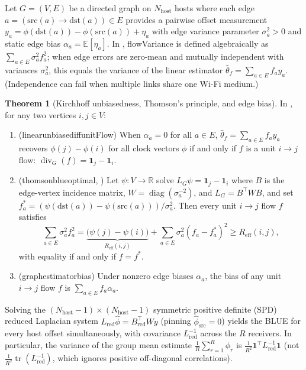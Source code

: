\documentclass[11pt,a4paper]{article}
\DeclareRobustCommand{\lean}[1]{{\ttfamily\def\_{\textunderscore\allowbreak}#1}}
\newcommand{\R}{\mathbb{R}}
\newcommand{\E}{\mathbb{E}}
\theoremstyle{definition}
\newtheorem{theorem}[definition]{Theorem}
\begin{document}
Let $G = (V, E)$ be a directed graph on $N_{\mathrm{host}}$ hosts where each
edge $a = (\mathrm{src}(a) \to \mathrm{dst}(a)) \in E$ provides a pairwise
offset measurement $y_a = \phi(\mathrm{dst}(a)) - \phi(\mathrm{src}(a)) + \eta_a$
with edge variance parameter $\sigma_a^2 > 0$ and static edge bias
$\alpha_a = \E[\eta_a]$. In ,
\lean{flowVariance} is defined algebraically as $\sum_{a \in E} \sigma_a^2 f_a^2$;
when edge errors are zero-mean and mutually independent with variances
$\sigma_a^2$, this equals the variance of the linear estimator
$\hat\theta_f = \sum_{a \in E} f_a y_a$. (Independence can fail when multiple
links share one Wi-Fi medium.)

\begin{theorem}[Kirchhoff unbiasedness, Thomson's principle, and edge bias]
\label{thm:thomson}
In , for any two vertices $i, j \in V$:
\begin{enumerate}
\item (\lean{linear\_unbiased\_iff\_unitFlow}) When $\alpha_a = 0$ for all
  $a \in E$, $\hat\theta_f = \sum_{a \in E} f_a y_a$ recovers
  $\phi(j) - \phi(i)$ for all clock vectors $\phi$ if and only if $f$ is a unit
  $i \to j$ flow: $\operatorname{div}_G(f) = \mathbf{1}_j - \mathbf{1}_i$.
\item (\lean{thomson\_blue\_optimal}, \cite{doyle1984,barooah2007,giridhar2006})
  Let $\psi : V \to \R$ solve $L_G \psi = \mathbf{1}_j - \mathbf{1}_i$ where
  $B$ is the edge-vertex incidence matrix,
  $W = \operatorname{diag}(\sigma_a^{-2})$, and $L_G = B^\top W B$, and set
  $f_a^* = (\psi(\mathrm{dst}(a)) - \psi(\mathrm{src}(a))) / \sigma_a^2$. Then
  every unit $i \to j$ flow $f$ satisfies
  \[
    \sum_{a \in E} \sigma_a^2 f_a^2
    = \underbrace{\bigl(\psi(j) - \psi(i)\bigr)}_{R_{\mathrm{eff}}(i, j)}
      + \sum_{a \in E} \sigma_a^2 (f_a - f_a^*)^2
    \ge R_{\mathrm{eff}}(i, j),
  \]
  with equality if and only if $f = f^*$.
\item (\lean{graph\_estimator\_bias}) Under nonzero edge biases $\alpha_a$, the
  bias of any unit $i \to j$ flow $f$ is $\sum_{a \in E} f_a \alpha_a$.
\end{enumerate}
\end{theorem}

Solving the $(N_{\mathrm{host}}{-}1)\times(N_{\mathrm{host}}{-}1)$ symmetric
positive definite (SPD) reduced Laplacian system
$L_{\mathrm{red}} \hat\phi = B_{\mathrm{red}}^\top W y$
(pinning $\hat\phi_{\mathrm{src}} = 0$) yields the BLUE for every host offset
simultaneously, with covariance $L_{\mathrm{red}}^{-1}$ across the $R$
receivers. In particular, the variance of the group mean estimate
$\frac{1}{R}\sum_{r=1}^R \hat\phi_r$ is
$\frac{1}{R^2}\mathbf{1}^\top L_{\mathrm{red}}^{-1}\mathbf{1}$ (not
$\frac{1}{R^2}\operatorname{tr}(L_{\mathrm{red}}^{-1})$, which ignores positive
off-diagonal correlations).
\end{document}

